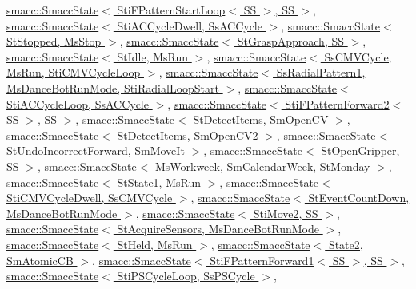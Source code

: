 \hyperlink{classsmacc_1_1SmaccState_afc39f8e0ca4001b2159a100da2fccd0e}{smacc\+::\+Smacc\+State$<$ Sti\+F\+Pattern\+Start\+Loop$<$ S\+S $>$, S\+S $>$}, \hyperlink{classsmacc_1_1SmaccState_afc39f8e0ca4001b2159a100da2fccd0e}{smacc\+::\+Smacc\+State$<$ Sti\+A\+C\+Cycle\+Dwell, Ss\+A\+C\+Cycle $>$}, \hyperlink{classsmacc_1_1SmaccState_afc39f8e0ca4001b2159a100da2fccd0e}{smacc\+::\+Smacc\+State$<$ St\+Stopped, Ms\+Stop $>$}, \hyperlink{classsmacc_1_1SmaccState_afc39f8e0ca4001b2159a100da2fccd0e}{smacc\+::\+Smacc\+State$<$ St\+Grasp\+Approach, S\+S $>$}, \hyperlink{classsmacc_1_1SmaccState_afc39f8e0ca4001b2159a100da2fccd0e}{smacc\+::\+Smacc\+State$<$ St\+Idle, Ms\+Run $>$}, \hyperlink{classsmacc_1_1SmaccState_afc39f8e0ca4001b2159a100da2fccd0e}{smacc\+::\+Smacc\+State$<$ Ss\+C\+M\+V\+Cycle, Ms\+Run, Sti\+C\+M\+V\+Cycle\+Loop $>$}, \hyperlink{classsmacc_1_1SmaccState_afc39f8e0ca4001b2159a100da2fccd0e}{smacc\+::\+Smacc\+State$<$ Ss\+Radial\+Pattern1, Ms\+Dance\+Bot\+Run\+Mode, Sti\+Radial\+Loop\+Start $>$}, \hyperlink{classsmacc_1_1SmaccState_afc39f8e0ca4001b2159a100da2fccd0e}{smacc\+::\+Smacc\+State$<$ Sti\+A\+C\+Cycle\+Loop, Ss\+A\+C\+Cycle $>$}, \hyperlink{classsmacc_1_1SmaccState_afc39f8e0ca4001b2159a100da2fccd0e}{smacc\+::\+Smacc\+State$<$ Sti\+F\+Pattern\+Forward2$<$ S\+S $>$, S\+S $>$}, \hyperlink{classsmacc_1_1SmaccState_afc39f8e0ca4001b2159a100da2fccd0e}{smacc\+::\+Smacc\+State$<$ St\+Detect\+Items, Sm\+Open\+C\+V $>$}, \hyperlink{classsmacc_1_1SmaccState_afc39f8e0ca4001b2159a100da2fccd0e}{smacc\+::\+Smacc\+State$<$ St\+Detect\+Items, Sm\+Open\+C\+V2 $>$}, \hyperlink{classsmacc_1_1SmaccState_afc39f8e0ca4001b2159a100da2fccd0e}{smacc\+::\+Smacc\+State$<$ St\+Undo\+Incorrect\+Forward, Sm\+Move\+It $>$}, \hyperlink{classsmacc_1_1SmaccState_afc39f8e0ca4001b2159a100da2fccd0e}{smacc\+::\+Smacc\+State$<$ St\+Open\+Gripper, S\+S $>$}, \hyperlink{classsmacc_1_1SmaccState_afc39f8e0ca4001b2159a100da2fccd0e}{smacc\+::\+Smacc\+State$<$ Ms\+Workweek, Sm\+Calendar\+Week, St\+Monday $>$}, \hyperlink{classsmacc_1_1SmaccState_afc39f8e0ca4001b2159a100da2fccd0e}{smacc\+::\+Smacc\+State$<$ St\+State1, Ms\+Run $>$}, \hyperlink{classsmacc_1_1SmaccState_afc39f8e0ca4001b2159a100da2fccd0e}{smacc\+::\+Smacc\+State$<$ Sti\+C\+M\+V\+Cycle\+Dwell, Ss\+C\+M\+V\+Cycle $>$}, \hyperlink{classsmacc_1_1SmaccState_afc39f8e0ca4001b2159a100da2fccd0e}{smacc\+::\+Smacc\+State$<$ St\+Event\+Count\+Down, Ms\+Dance\+Bot\+Run\+Mode $>$}, \hyperlink{classsmacc_1_1SmaccState_afc39f8e0ca4001b2159a100da2fccd0e}{smacc\+::\+Smacc\+State$<$ Sti\+Move2, S\+S $>$}, \hyperlink{classsmacc_1_1SmaccState_afc39f8e0ca4001b2159a100da2fccd0e}{smacc\+::\+Smacc\+State$<$ St\+Acquire\+Sensors, Ms\+Dance\+Bot\+Run\+Mode $>$}, \hyperlink{classsmacc_1_1SmaccState_afc39f8e0ca4001b2159a100da2fccd0e}{smacc\+::\+Smacc\+State$<$ St\+Held, Ms\+Run $>$}, \hyperlink{classsmacc_1_1SmaccState_afc39f8e0ca4001b2159a100da2fccd0e}{smacc\+::\+Smacc\+State$<$ State2, Sm\+Atomic\+C\+B $>$}, \hyperlink{classsmacc_1_1SmaccState_afc39f8e0ca4001b2159a100da2fccd0e}{smacc\+::\+Smacc\+State$<$ Sti\+F\+Pattern\+Forward1$<$ S\+S $>$, S\+S $>$}, \hyperlink{classsmacc_1_1SmaccState_afc39f8e0ca4001b2159a100da2fccd0e}{smacc\+::\+Smacc\+State$<$ Sti\+P\+S\+Cycle\+Loop, Ss\+P\+S\+Cycle $>$}, 